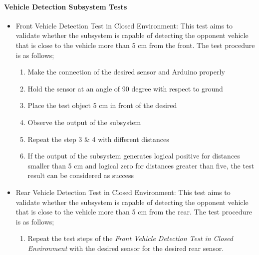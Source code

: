 \documentclass[a4paper,12pt]{article}
\begin{document}
	\paragraph{Vehicle Detection Subsystem Tests}
		
		\begin{itemize}
		
		\item Front Vehicle Detection Test in Closed Environment:
			This test aims to validate whether the subsystem is capable of detecting the opponent vehicle that is close to the vehicle more than 5 cm from the front. The test procedure is as follows; 		
			
			\begin{enumerate}
				\item Make the connection of the desired sensor and Arduino properly \vspace{-0.2cm}
				\item Hold the sensor at an angle of 90 degree with respect to ground \vspace{-0.2cm}
				\item Place the test object 5 cm in front of the desired \vspace{-0.2cm}
				\item Observe the output of the subsystem \vspace{-0.2cm}
				\item Repeat the step 3 \& 4 with different distances \vspace{-0.2cm}
				\item If the output of the subsystem generates logical positive for distances smaller than 5 cm and logical zero for distances greater than five, the test result can be considered as success \vspace{-0.2cm}
			\end{enumerate}					
		
		\item Rear Vehicle Detection Test in Closed Environment:
			This test aims to validate whether the subsystem is capable of detecting the opponent vehicle that is close to the vehicle more than 5 cm from the rear. The test procedure is as follows; 		
			\begin{enumerate}
				\item Repeat the test steps of the \textit{Front Vehicle Detection Test in Closed Environment} with the desired sensor for the desired rear sensor.  \vspace{-0.2cm}
			\end{enumerate}
		

\end{itemize}
\end{document}
